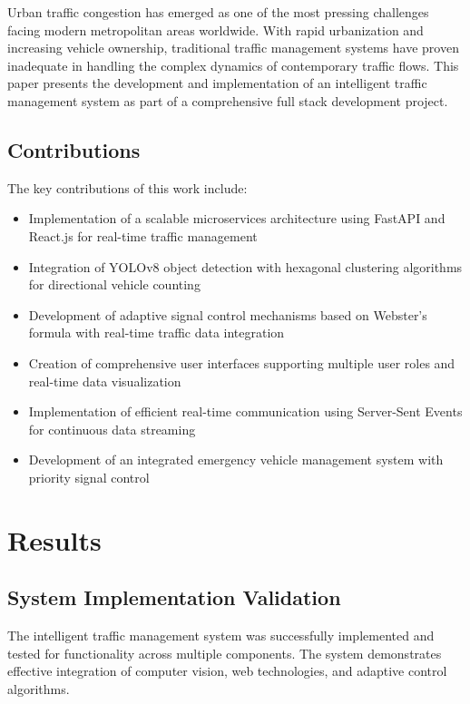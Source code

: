 \documentclass[conference]{IEEEtran}
\begin{document}
Urban traffic congestion has emerged as one of the most pressing challenges facing modern metropolitan areas worldwide. With rapid urbanization and increasing vehicle ownership, traditional traffic management systems have proven inadequate in handling the complex dynamics of contemporary traffic flows. This paper presents the development and implementation of an intelligent traffic management system as part of a comprehensive full stack development project.

\subsection{Contributions}

The key contributions of this work include:

\begin{itemize}
\item Implementation of a scalable microservices architecture using FastAPI and React.js for real-time traffic management
\item Integration of YOLOv8 object detection with hexagonal clustering algorithms for directional vehicle counting
\item Development of adaptive signal control mechanisms based on Webster's formula with real-time traffic data integration
\item Creation of comprehensive user interfaces supporting multiple user roles and real-time data visualization
\item Implementation of efficient real-time communication using Server-Sent Events for continuous data streaming
\item Development of an integrated emergency vehicle management system with priority signal control
\end{itemize}

\section{Results}

\subsection{System Implementation Validation}

The intelligent traffic management system was successfully implemented and tested for functionality across multiple components. The system demonstrates effective integration of computer vision, web technologies, and adaptive control algorithms.
\end{document}
